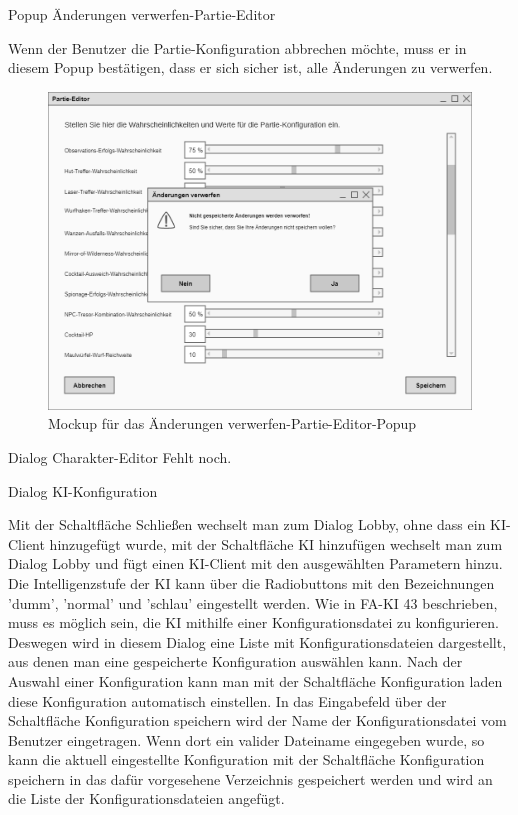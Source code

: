 Popup \glqq{}Änderungen verwerfen-Partie-Editor\grqq{}

Wenn der Benutzer die Partie-Konfiguration abbrechen möchte, muss er in diesem Popup bestätigen, dass er sich sicher ist, alle Änderungen zu verwerfen.

\begin{figure}
  \centering
  \includegraphics[width=\textwidth]{Meilenstein03/AenderungenVerwerfen-Partie-Editor_Mockup.png}
  \caption{Mockup für das Änderungen verwerfen-Partie-Editor-Popup}
\end{figure}

Dialog \glqq{}Charakter-Editor\grqq{}
Fehlt noch.

Dialog \glqq{}KI-Konfiguration\grqq{}

Mit der Schaltfläche \glqq{}Schließen\grqq{} wechselt man zum Dialog \glqq{}Lobby\grqq{}, ohne dass ein KI-Client hinzugefügt wurde, mit der Schaltfläche \glqq{}KI hinzufügen\grqq{} wechselt man zum Dialog \glqq{}Lobby\grqq{} und fügt einen KI-Client mit den ausgewählten Parametern hinzu.
Die Intelligenzstufe der KI kann über die Radiobuttons mit den Bezeichnungen 'dumm', 'normal' und 'schlau' eingestellt werden.
Wie in FA-KI 43 beschrieben, muss es möglich sein, die KI mithilfe einer Konfigurationsdatei zu konfigurieren. Deswegen wird in diesem Dialog eine Liste mit Konfigurationsdateien dargestellt, aus denen man eine gespeicherte Konfiguration auswählen kann. Nach der Auswahl einer Konfiguration kann man mit der Schaltfläche \glqq{}Konfiguration laden\grqq{} diese Konfiguration automatisch einstellen.
In das Eingabefeld über der Schaltfläche \glqq{}Konfiguration speichern\grqq{} wird der Name der Konfigurationsdatei vom Benutzer eingetragen. Wenn dort ein valider Dateiname eingegeben wurde, so kann die aktuell eingestellte Konfiguration mit der Schaltfläche \glqq{}Konfiguration speichern\grqq{} in das dafür vorgesehene Verzeichnis gespeichert werden und wird an die Liste der Konfigurationsdateien angefügt.

